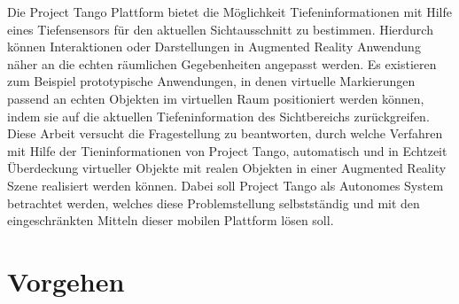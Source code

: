Die Project Tango Plattform bietet die Möglichkeit Tiefeninformationen mit Hilfe eines Tiefensensors für den aktuellen Sichtausschnitt zu bestimmen. Hierdurch können Interaktionen oder Darstellungen in Augmented Reality Anwendung näher an die echten räumlichen Gegebenheiten angepasst werden. Es existieren zum Beispiel prototypische Anwendungen, in denen virtuelle Markierungen passend an echten Objekten im virtuellen Raum positioniert werden können, indem sie auf die aktuellen Tiefeninformation des Sichtbereichs zurückgreifen.\\

Diese Arbeit versucht die Fragestellung zu beantworten, durch welche Verfahren mit Hilfe der Tieninformationen von Project Tango, automatisch und in Echtzeit Überdeckung virtueller Objekte mit realen Objekten in einer Augmented Reality Szene realisiert werden können. Dabei soll Project Tango als Autonomes System betrachtet werden, welches diese Problemstellung selbstständig und mit den eingeschränkten Mitteln dieser mobilen Plattform lösen soll.\\

\section{Vorgehen}






